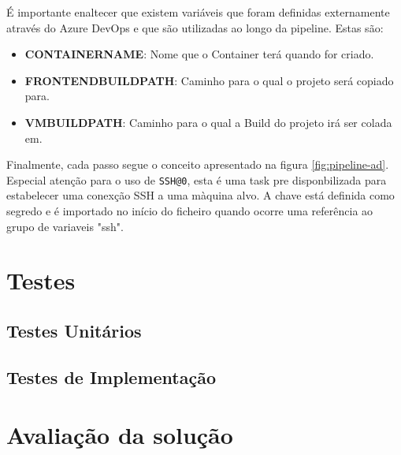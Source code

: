 É importante enaltecer que existem variáveis que foram definidas externamente através do Azure DevOps e que são utilizadas ao longo da pipeline. Estas são:

\begin{itemize}
    \item \textbf{CONTAINERNAME}: Nome que o \gls{Container} terá quando for criado.
    \item \textbf{FRONTENDBUILDPATH}: Caminho para o qual o projeto será copiado para.
    \item \textbf{VMBUILDPATH}: Caminho para o qual a \gls{Build} do projeto irá ser colada em.
\end{itemize}

Finalmente, cada passo segue o conceito apresentado na figura \ref{fig:pipeline-ad}. Especial atenção para o uso de \lstinline|SSH@0|\cite{docs-SSH0}, esta é uma task pre disponbilizada para estabelecer uma conexção SSH a uma màquina alvo. A chave está definida como segredo e é importado no início do ficheiro quando ocorre uma referência ao grupo de variaveis "ssh".

\section{Testes}

\subsection{Testes Unitários}

\subsection{Testes de Implementação}

\section{Avaliação da solução}